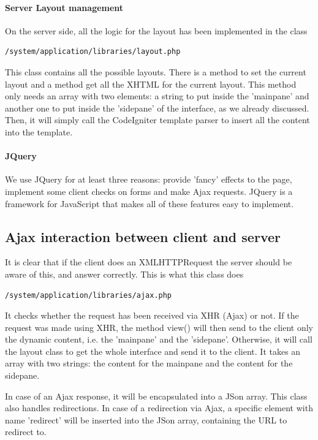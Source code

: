 \documentclass[10pt]{report}
\begin{document}
\paragraph{Server Layout management}
On the server side, all the logic for the layout has been implemented in the class \begin{verbatim}/system/application/libraries/layout.php
\end{verbatim}
This class contains all the possible layouts. There is a method to set the current layout and a method get all the XHTML for the current layout. This method only needs an array with two elements: a string to put inside the 'mainpane' and another one to put inside the 'sidepane' of the interface, as we already discussed. Then, it will simply call the CodeIgniter template parser to insert all the content into the template.

\paragraph{JQuery}
We use JQuery for at least three reasons: provide 'fancy' effects to the page, implement some client checks on forms and make Ajax requests. JQuery is a framework for JavaScript that makes all of these features easy to implement.

\subsection{Ajax interaction between client and server}
It is clear that if the client does an XMLHTTPRequest the server should be aware of this, and answer correctly. This is what this class does
\begin{verbatim}/system/application/libraries/ajax.php
\end{verbatim}
It checks whether the request has been received via XHR (Ajax) or not. If the request was made using XHR, the method view() will then send to the client only the dynamic content, i.e. the 'mainpane' and the 'sidepane'. Otherwise, it will call the layout class to get the whole interface and send it to the client. It takes an array with two strings: the content for the mainpane and the content for the sidepane.

In case of an Ajax response, it will be encapsulated into a JSon array. This class also handles redirections. In case of a redirection via Ajax, a specific element with name 'redirect' will be inserted into the JSon array, containing the URL to redirect to.
\end{document}
